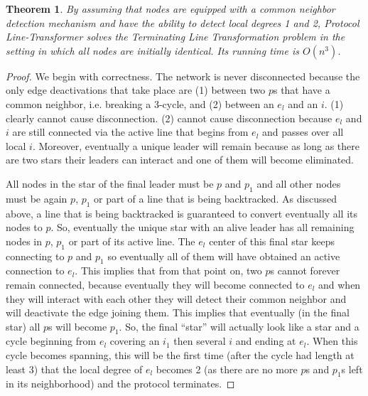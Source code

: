 \documentclass[preprint]{elsarticle}
\newtheorem{theorem}{Theorem}
\begin{document}
\begin{theorem} \label{the:line-transformer}
By assuming that nodes are equipped with a common neighbor detection mechanism and have the ability to detect local degrees 1 and 2, Protocol Line-Transformer solves the Terminating Line Transformation problem in the setting in which all nodes are initially identical. Its running time is $O(n^3)$.
\end{theorem}
\begin{proof}
We begin with correctness. The network is never disconnected because the only edge deactivations
that take place are (1) between two $p$s that have a common neighbor, i.e.
breaking a 3-cycle, and (2) between an $e_l$ and an $i$. (1) clearly cannot
cause disconnection. (2) cannot cause disconnection because $e_l$ and $i$ are
still connected via the active line that begins from $e_l$ and passes over
all local $i$. Moreover, eventually a unique leader will remain because as long as there are two
stars their leaders can interact and one of them will become eliminated.

All nodes in the star of the final leader must be $p$ and $p_1$ and all other
nodes must be again $p$, $p_1$ or part of a line that is being backtracked. As
discussed above, a line that is being backtracked is guaranteed to convert
eventually all its nodes to $p$. So, eventually the unique star with an
alive leader has all remaining nodes in $p$, $p_1$ or part of its active line.
The $e_l$ center of this final star keeps connecting to $p$ and $p_1$ so eventually
all of them will have obtained an active connection to $e_l$. This implies
that from that point on, two $p$s cannot forever remain connected, because
eventually they will become connected to $e_l$ and when they will interact
with each other they will detect their common neighbor and will deactivate
the edge joining them. This implies that eventually (in the final star)
all $p$s will become $p_1$. So, the final ``star'' will actually look like a star
and a cycle beginning from $e_l$ covering an $i_1$ then several $i$ and ending at
$e_l$. When this cycle becomes spanning, this will be the first time (after
the cycle had length at least 3) that the local degree of $e_l$ becomes 2
(as there are no more $p$s and $p_1$s left in its neighborhood) and the protocol
terminates.


\end{proof}
\end{document}
